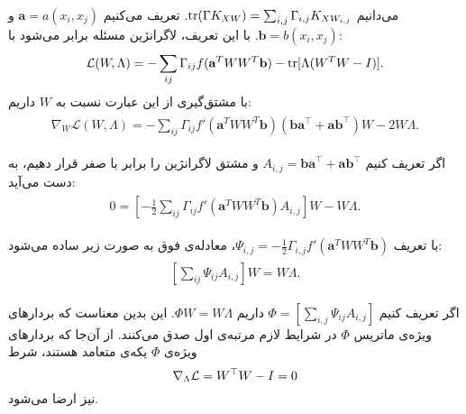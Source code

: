 می‌دانیم
$\mathrm{tr}(\Gamma K_{XW})=\sum_{i,j} \Gamma_{i,j}K_{XW_{i,j}}$. 
تعریف می‌کنیم
$\mathbf{a} = a(x_i, x_j)$ و $ \mathbf{b} = b(x_i, x_j)$. 
با این تعریف، لاگرانژین مسئله‌ برابر می‌شود با:
    \begin{align}
\begin{split}
\mathcal{L}(W, \Lambda) = -\sum_{ij}
\Gamma_{ij} f(\mathbf{a}^{T}WW^{T}\mathbf{b}) 
- \mathrm{tr}[\Lambda(W^{T}W-I)]. \label{eq:Lagrangian}
\end{split}
\end{align}
با مشتق‌گیری از این عبارت نسبت به 
$W$
داریم:
    \begin{align}
\begin{split}
\nabla_W \mathcal{L}(W, \Lambda) = 
-\sum_{ij}{\Gamma_{ij} f'(\mathbf{a}^{T}WW^{T}\mathbf{b})} (\mathbf{b}\mathbf{a}^\top  + \mathbf{a}\mathbf{b}^\top )W - 2 W \Lambda.
\end{split}
\label{eq:lagrangian_gradient}
\end{align}

اگر تعریف کنیم
$A_{i,j}=\mathbf{ba}^\top +\mathbf{ab}^\top $
و مشتق لاگرانژین را برابر با صفر قرار دهیم، به دست می‌آید:
    \begin{align}
\begin{split}
0 = \left[-\frac{1}{2}\sum_{ij}{\Gamma_{ij} f'(\mathbf{a}^{T}WW^{T}\mathbf{b})} A_{i,j}\right] W - W \Lambda.
\end{split}\label{eq:eig_decomp_1}
\end{align}

با تعریف 
$\Psi_{i,j} = -\frac{1}{2}\Gamma_{i,j}f'(\mathbf{a}^{T}WW^{T}\mathbf{b})$،
معادله‌ی فوق به صورت زیر ساده‌ می‌شود:
    \begin{align}
\begin{split}
\left[\sum_{ij}{\Psi_{ij}} A_{i,j}\right] W = W \Lambda.
\end{split}\label{eq:eig_decomp_2}
\end{align}

اگر تعریف کنیم
$\Phi = [\sum_{i, j} \Psi_{ij}A_{i, j}]$
داریم
$\Phi W = W \Lambda$.
این بدین معناست که  بردار‌ها‌‌ی‌ ویژه‌ی ماتریس 
$\Phi$
در شرایط لازم مرتبه‌ی اول
صدق می‌کنند. از آن‌جا که بردار‌های ویژه‌ی $\Phi$ یکه‌ی متعامد هستند، شرط 
\begin{equation}
\nabla_\Lambda \mathcal{L} = W^\top W - I = 0
\end{equation}
نیز ارضا می‌شود.



